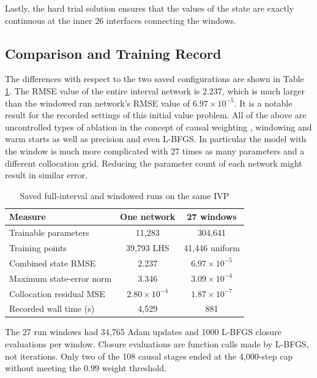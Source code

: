 \documentclass[conference]{IEEEtran}
\begin{document}
Lastly, the hard trial solution ensures that the values of the state are exactly continuous at the inner 26 interfaces connecting the windows.


\subsection{Comparison and Training Record}
The differences with respect to the two saved configurations are shown in Table \ref{tab:comparison}. The RMSE value of the entire interval network is 2.237, which is much larger than the windowed run network's RMSE value of $6.97\times10^{-5}$. It is a notable result for the recorded settings of this initial value problem. All of the above are uncontrolled types of ablation in the concept of causal weighting \cite{wang2024causal}, windowing \cite{penwarden2023} and warm starts as well as precision and even L-BFGS. In particular the model with the window is much more complicated with 27 times as many parameters and a different collocation grid. Reducing the parameter count of each network might result in similar error.

\begin{table}[t]
\caption{Saved full-interval and windowed runs on the same IVP}
\label{tab:comparison}
\centering\footnotesize
\begin{tabular}{lcc}
\toprule
Measure & One network & 27 windows\\
\midrule
Trainable parameters & 11,283 & 304,641\\
Training points & 39,793 LHS & 41,446 uniform\\
Combined state RMSE & 2.237 & $6.97\times10^{-5}$\\
Maximum state-error norm & 3.346 & $3.09\times10^{-4}$\\
Collocation residual MSE & $2.80\times10^{-4}$ & $1.87\times10^{-7}$\\
Recorded wall time (s) & 4,529 & 881\\
\bottomrule
\end{tabular}
\end{table}

The 27 run windows had 34,765 Adam updates and 1000 L-BFGS closure evaluations per window. Closure evaluations are function calls made by L-BFGS, not iterations. Only two of the 108 causal stages ended at the 4,000-step cap without meeting the $0.99$ weight threshold.
\end{document}
